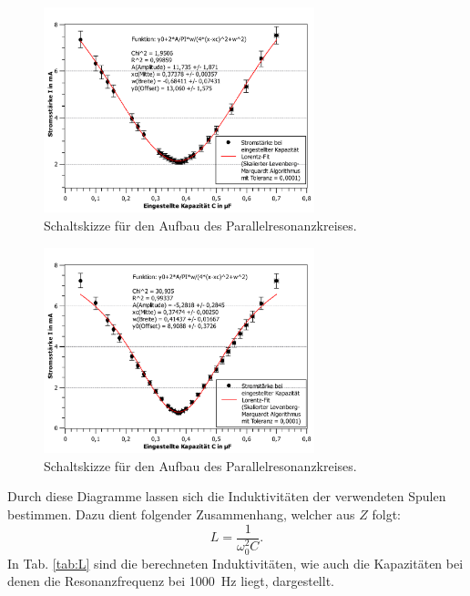 	\begin{figure}[ht]
		\centering
		\includegraphics[width=0.7\textwidth]{auswertung/Parallel-2kohm(algo).pdf}
		\caption{Schaltskizze für den Aufbau des Parallelresonanzkreises.}
		\label{fig:parallel2k}	
	\end{figure}
	\begin{figure}[ht]
		\centering
		\includegraphics[width=0.7\textwidth]{auswertung/Parallel-10kohm(algo).pdf}
		\caption{Schaltskizze für den Aufbau des Parallelresonanzkreises.}
		\label{fig:parallel10k}	
	\end{figure}	
	Durch diese Diagramme lassen sich die Induktivitäten der verwendeten Spulen bestimmen.
	Dazu dient folgender Zusammenhang, welcher aus $Z$ folgt:
	\begin{equation}
		L = \frac{1}{\omega_0^2 C}.
	\end{equation}
	In Tab. \ref{tab:L} sind die berechneten Induktivitäten, wie auch die Kapazitäten bei denen die Resonanzfrequenz bei \SI{1000}{\hertz} liegt, dargestellt.	
